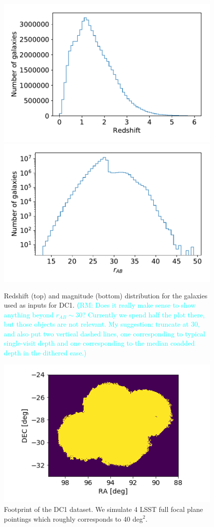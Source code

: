 \documentclass[twocolumn]{aastex62}
\newcommand{\rachel}[1]{{\textcolor{cyan}{{\textbf (RM: #1)}}}}
\begin{document}
\begin{figure}
\centering
\includegraphics[width=0.9\columnwidth]{N_z_DC1.pdf}
\includegraphics[width=0.9\columnwidth]{N_m_DC1.pdf}
\caption{Redshift (top) and magnitude (bottom) distribution for the galaxies used as inputs for DC1. \rachel{Does it really make sense to show anything beyond $r_{AB}\sim 30$?  Currently we spend half the plot there, but those objects are not relevant.  My suggestion: truncate at 30, and also put two vertical dashed lines, one corresponding to typical single-visit depth and one corresponding to the median coadded depth in the dithered case.}}
\label{fig:catalog_plots}
\end{figure}

\begin{figure}
\centering
\includegraphics[width=0.9\columnwidth]{footprint.png}
\caption{Footprint of the DC1 dataset. We simulate 4 LSST full focal plane pointings which roughly corresponds to 40 deg$^{2}$.}
\label{fig:footprint}
\end{figure}
\end{document}
